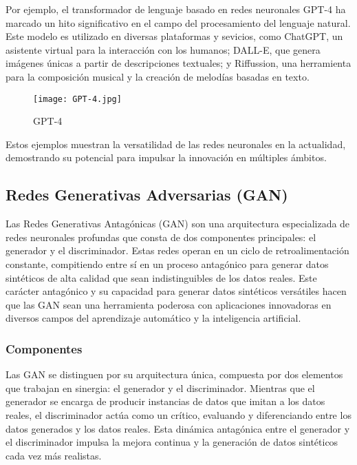 Por ejemplo, el transformador de lenguaje basado en redes neuronales GPT-4 ha marcado un hito significativo en el campo del procesamiento del lenguaje natural. Este modelo es utilizado en diversas plataformas y sevicios, como ChatGPT, un asistente virtual para la interacción con los humanos; DALL-E, que genera imágenes únicas a partir de descripciones textuales; y Riffussion, una herramienta para la composición musical y la creación de melodías basadas en texto.

\begin{figure}[H]
    \centering
    \texttt{[image: GPT-4.jpg]}
    \caption{GPT-4}
    \label{fig:GPT-4}
\end{figure}

Estos ejemplos muestran la versatilidad de las redes neuronales en la actualidad, demostrando su potencial para impulsar la innovación en múltiples ámbitos.

\subsection{Redes Generativas Adversarias (GAN)}\label{subsec:gan}
Las Redes Generativas Antagónicas (GAN) son una arquitectura especializada de redes neuronales profundas que consta de dos componentes principales: el generador y el discriminador. Estas redes operan en un ciclo de retroalimentación constante, compitiendo entre sí en un proceso antagónico para generar datos sintéticos de alta calidad que sean indistinguibles de los datos reales. Este carácter antagónico y su capacidad para generar datos sintéticos versátiles hacen que las GAN sean una herramienta poderosa con aplicaciones innovadoras en diversos campos del aprendizaje automático y la inteligencia artificial. \cite{gan-mathworks}

\subsubsection{Componentes}
Las GAN se distinguen por su arquitectura única, compuesta por dos elementos que trabajan en sinergia: el generador y el discriminador. Mientras que el generador se encarga de producir instancias de datos que imitan a los datos reales, el discriminador actúa como un crítico, evaluando y diferenciando entre los datos generados y los datos reales. Esta dinámica antagónica entre el generador y el discriminador impulsa la mejora continua y la generación de datos sintéticos cada vez más realistas.

